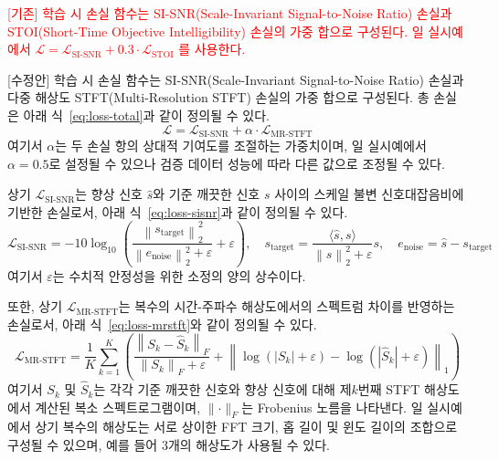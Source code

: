 \documentclass{article}
\newcommand{\reviewold}[1]{{\par\noindent\textcolor{red}{[기존] #1}}}
\begin{document}
\reviewold{학습 시 손실 함수는 SI-SNR(Scale-Invariant Signal-to-Noise Ratio) 손실과 STOI(Short-Time Objective Intelligibility) 손실의 가중 합으로 구성된다. 일 실시예에서 $\mathcal{L} = \mathcal{L}_{\text{SI-SNR}} + 0.3 \cdot \mathcal{L}_{\text{STOI}}$ 를 사용한다.}
{\par\noindent\color{customblue}[수정안] 학습 시 손실 함수는 SI-SNR(Scale-Invariant Signal-to-Noise Ratio) 손실과 다중 해상도 STFT(Multi-Resolution STFT) 손실의 가중 합으로 구성된다. 총 손실은 아래 식~\eqref{eq:loss-total}과 같이 정의될 수 있다.
\begin{equation}\label{eq:loss-total}
    \mathcal{L} = \mathcal{L}_{\text{SI-SNR}} + \alpha \cdot \mathcal{L}_{\text{MR-STFT}}
\end{equation}
여기서 $\alpha$는 두 손실 항의 상대적 기여도를 조절하는 가중치이며, 일 실시예에서 $\alpha = 0.5$로 설정될 수 있으나 검증 데이터 성능에 따라 다른 값으로 조정될 수 있다.

상기 $\mathcal{L}_{\text{SI-SNR}}$는 향상 신호 $\hat{s}$와 기준 깨끗한 신호 $s$ 사이의 스케일 불변 신호대잡음비에 기반한 손실로서, 아래 식~\eqref{eq:loss-sisnr}과 같이 정의될 수 있다.
\begin{equation}\label{eq:loss-sisnr}
    \mathcal{L}_{\text{SI-SNR}} = -10 \log_{10}
    \left(
    \frac{\left\lVert s_{\mathrm{target}} \right\rVert_2^2}
         {\left\lVert e_{\mathrm{noise}} \right\rVert_2^2 + \varepsilon}
    + \varepsilon
    \right),
    \quad
    s_{\mathrm{target}} = \frac{\langle \hat{s}, s \rangle}{\left\lVert s \right\rVert_2^2 + \varepsilon} s,
    \quad
    e_{\mathrm{noise}} = \hat{s} - s_{\mathrm{target}}
\end{equation}
여기서 $\varepsilon$는 수치적 안정성을 위한 소정의 양의 상수이다.

또한, 상기 $\mathcal{L}_{\text{MR-STFT}}$는 복수의 시간-주파수 해상도에서의 스펙트럼 차이를 반영하는 손실로서, 아래 식~\eqref{eq:loss-mrstft}와 같이 정의될 수 있다.
\begin{equation}\label{eq:loss-mrstft}
    \mathcal{L}_{\text{MR-STFT}}
    =
    \frac{1}{K}
    \sum_{k=1}^{K}
    \left(
    \frac{\left\lVert S_k - \hat{S}_k \right\rVert_F}
         {\left\lVert S_k \right\rVert_F + \varepsilon}
    +
    \left\lVert
    \log\!\left( |S_k| + \varepsilon \right)
    -
    \log\!\left( |\hat{S}_k| + \varepsilon \right)
    \right\rVert_1
    \right)
\end{equation}
여기서 $S_k$ 및 $\hat{S}_k$는 각각 기준 깨끗한 신호와 향상 신호에 대해 제$k$번째 STFT 해상도에서 계산된 복소 스펙트로그램이며, $\lVert \cdot \rVert_F$는 Frobenius 노름을 나타낸다. 일 실시예에서 상기 복수의 해상도는 서로 상이한 FFT 크기, 홉 길이 및 윈도 길이의 조합으로 구성될 수 있으며, 예를 들어 3개의 해상도가 사용될 수 있다.\par}
\end{document}
